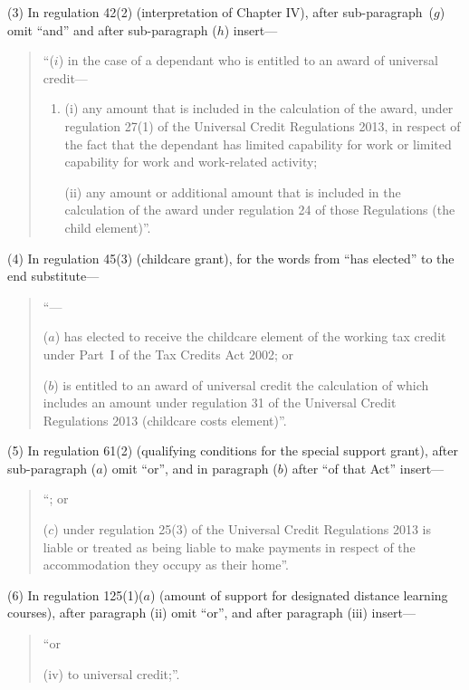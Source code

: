 \documentclass[12pt,a4paper]{article}
\begin{document}
\begin{sloppypar}
(3) In regulation 42(2) (interpretation of Chapter IV), after sub-paragraph~($g$)  omit “and” and after sub-paragraph ($h$)  insert—
\end{sloppypar}
\begin{quotation}
“($i$) in the case of a dependant who is entitled to an award of universal credit—
\begin{enumerate}\item[]
(i) any amount that is included in the calculation of the award, under regulation 27(1) of the Universal Credit Regulations 2013, in respect of the fact that the dependant has limited capability for work or limited capability for work and work-related activity;

(ii) any amount or additional amount that is included in the calculation of the award under regulation 24 of those Regulations (the child element)”.
\end{enumerate}
\end{quotation}

(4) In regulation 45(3) (childcare grant), for the words from “has elected” to the end substitute—
\begin{quotation}
“—

($a$) has elected to receive the childcare element of the working tax credit under Part~I of the Tax Credits Act 2002; or

($b$) is entitled to an award of universal credit the calculation of which includes an amount under regulation 31 of the Universal Credit Regulations 2013 (childcare costs element)”.
\end{quotation}

(5) In regulation 61(2) (qualifying conditions for the special support grant), after sub-paragraph ($a$)  omit “or”, and in paragraph ($b$)  after “of that Act” insert—
\begin{quotation}
“; or

($c$) under regulation 25(3) of the Universal Credit Regulations 2013 is liable or treated as being liable to make payments in respect of the accommodation they occupy as their home”.
\end{quotation}

(6) In regulation 125(1)($a$)  (amount of support for designated distance learning courses), after paragraph (ii)  omit “or”, and after paragraph (iii)  insert—
\begin{quotation}
“or

(iv) to universal credit;”.
\end{quotation}
\end{document}
